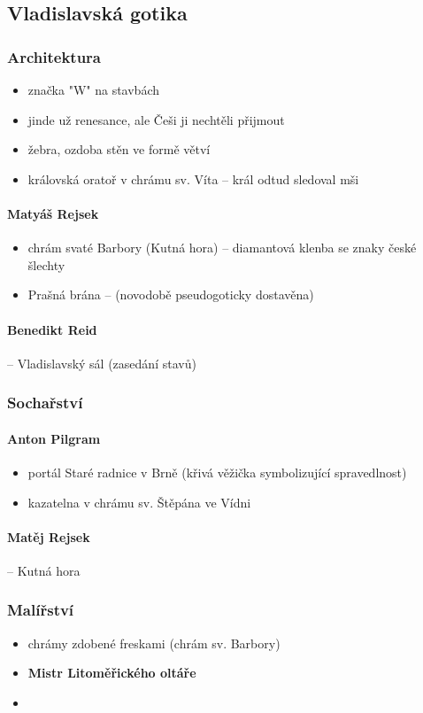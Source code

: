 \subsection{Vladislavská gotika}
\subsubsection{Architektura}
\begin{itemize}
\item značka "W" na stavbách
\item jinde už renesance, ale Češi ji nechtěli přijmout
\item žebra, ozdoba stěn ve formě větví
\item královská oratoř v chrámu sv. Víta -- král odtud sledoval mši
\end{itemize}

\paragraph{Matyáš Rejsek}
\begin{itemize}
\item chrám svaté Barbory (Kutná hora) -- diamantová klenba se znaky české šlechty 
\item Prašná brána -- (novodobě pseudogoticky dostavěna)
\end{itemize}

\paragraph{Benedikt Reid} -- Vladislavský sál (zasedání stavů)

\subsubsection{Sochařství}
\paragraph{Anton Pilgram}
\begin{itemize}
\item portál Staré radnice v Brně (křivá věžička symbolizující spravedlnost)
\item kazatelna v chrámu sv. Štěpána ve Vídni
\end{itemize}

\paragraph{Matěj Rejsek} -- Kutná hora


\subsubsection{Malířství}
\begin{itemize}
\item chrámy zdobené freskami (chrám sv. Barbory)
\item \textbf{Mistr Litoměřického oltáře}
\end{itemize}

\begin{itemize}
\item[]
\end{itemize}

\timeline

